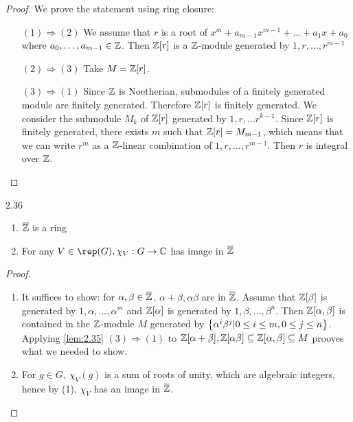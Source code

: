 \documentclass[twoside = false,	%
		headsepline,		%
		parskip = true,
		]{scrbook}						%
\begin{document}
    \begin{proof} We prove the statement using ring closure:
        \begin{enumerate}
            \item [$(1)\Rightarrow (2)$] We assume that $r$ is a root of $x^m+a_{m-1}x^{m-1}+\dots+a_1x+a_0$ where $a_0,\dots,a_{m-1}\in\mathbb Z$. Then $\mathbb Z[r]$ is a $\mathbb Z$-module generated by $1,r,\dots,r^{m-1}$
            \item[$(2)\Rightarrow (3)$] Take $M=\mathbb Z[r]$.
            \item[$(3)\Rightarrow (1)$] Since $\mathbb Z$ is Noetherian, submodules of a finitely generated module are finitely generated.
            Therefore $\mathbb Z[r]$ is finitely generated.
            We consider the submodule $M_k$ of $\mathbb Z[r]$ generated by $1,r,\dots r^{k-1}$. Since $\mathbb Z[r]$ is finitely generated, there exists $m$ such that $\mathbb Z[r]=M_{m-1}$, which means that we can write $r^m$ as a $\mathbb Z$-linear combination of $1,r,\dots,r^{m-1}$. Then $r$ is integral over $\mathbb Z$.
        \end{enumerate}
    \end{proof}
    
    \begin{corollary}{}{2.36}
        \begin{enumerate}
            \item $\overline{\mathbb Z}$ is a ring
            \item For any $V\in\rep(G), \chi_V:G \to\C$ has image in $\overline{\mathbb Z}$
        \end{enumerate}
    \end{corollary}

    \begin{proof}
        \begin{enumerate}
            \item It suffices to show: for $\alpha,\beta\in\overline{\mathbb Z}$, $\alpha+\beta, \alpha\beta$ are in $\overline{\mathbb Z}$. Assume that $\mathbb Z[\beta]$ is generated by $1,\alpha,\dots,\alpha^m$ and $\mathbb Z[\alpha]$ is generated by $1,\beta,\dots,\beta^n$. Then $\mathbb Z[\alpha,\beta]$ is contained in the $\mathbb Z$-module $M$ generated by $\left\{ \alpha^i\beta^j|0\leq i\leq m, 0\leq j\leq n\right\}$. Applying \ref{lem:2.35} $(3)\Rightarrow (1)$ to $\mathbb Z[\alpha+\beta], \mathbb Z[\alpha\beta]\subseteq\mathbb Z[\alpha,\beta]\subseteq M$ prooves what we needed to show.
            \item For $g\in G,\ \chi_V(g)$ is a sum of roots of unity, which are algebraic integers, hence by (1), $\chi_V$ has an image in $\overline{\mathbb Z}$.
        \end{enumerate}
    \end{proof}
    
\end{document}
